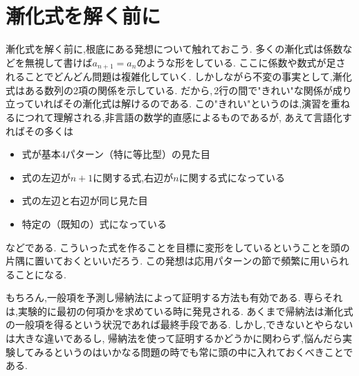 
\section{漸化式を解く前に}\label{sec:before}
  漸化式を解く前に,根底にある発想について触れておこう.
  多くの漸化式は係数などを無視して書けば$a_{n+1}=a_n$のような形をしている.
  ここに係数や数式が足されることでどんどん問題は複雑化していく.
  しかしながら不変の事実として,漸化式はある数列の2項の関係を示している.
  だから,\,2行の間で"きれい"な関係が成り立っていればその漸化式は解けるのである.
  この"きれい"というのは,演習を重ねるにつれて理解される,非言語の数学的直感によるものであるが,
  あえて言語化すればその多くは
  \begin{itemize}
    \item 式が基本4パターン（特に等比型）の見た目
    \item 式の左辺が$n+1$に関する式,右辺が$n$に関する式になっている
    \item 式の左辺と右辺が同じ見た目
    \item 特定の（既知の）式になっている
  \end{itemize}
  などである.
  こういった式を作ることを目標に変形をしているということを頭の片隅に置いておくといいだろう.
  この発想は応用パターンの節で頻繁に用いられることになる.

  もちろん,一般項を予測し帰納法によって証明する方法も有効である.
  専らそれは,実験的に最初の何項かを求めている時に発見される.
  あくまで帰納法は漸化式の一般項を得るという状況であれば最終手段である.
  しかし,できないとやらないは大きな違いであるし,
  帰納法を使って証明するかどうかに関わらず,悩んだら実験してみるというのはいかなる問題の時でも常に頭の中に入れておくべきことである.
